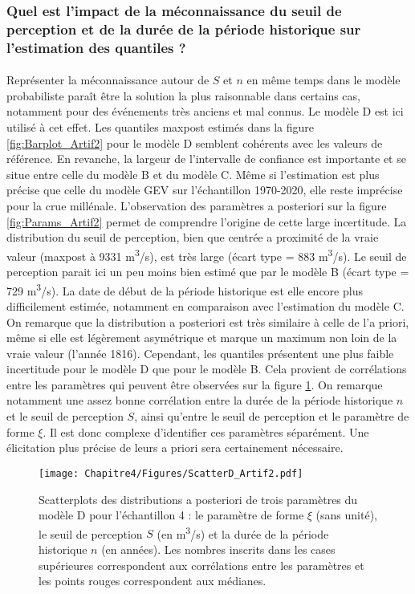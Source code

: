 	\subsubsection{Quel est l'impact de la méconnaissance du seuil de perception et de la durée de la période historique sur l'estimation des quantiles ?}	
	
	\paragraph{} Représenter la méconnaissance autour de $S$ et $n$ en même temps dans le modèle probabiliste paraît être la solution la plus raisonnable dans certains cas, notamment pour des événements très anciens et mal connus. Le modèle D est ici utilisé à cet effet. Les quantiles maxpost estimés dans la figure \ref{fig:Barplot_Artif2} pour le modèle D semblent cohérents avec les valeurs de référence. En revanche, la largeur de l'intervalle de confiance est importante et se situe entre celle du modèle B et du modèle C. Même si l'estimation est plus précise que celle du modèle GEV sur l'échantillon 1970-2020, elle reste imprécise pour la crue millénale. L'observation des paramètres a posteriori sur la figure \ref{fig:Params_Artif2} permet de comprendre l'origine de cette large incertitude. La distribution du seuil de perception, bien que centrée a proximité de la vraie valeur (maxpost à 9331 m\textsuperscript{3}/s), est très large (écart type = 883 m\textsuperscript{3}/s). Le seuil de perception parait ici un peu moins bien estimé que par le modèle B (écart type = 729 m\textsuperscript{3}/s). La date de début de la période historique est elle encore plus difficilement estimée, notamment en comparaison avec l'estimation du modèle C. On remarque que la distribution a posteriori est très similaire à celle de l'a priori, même si elle est légèrement asymétrique et marque un maximum non loin de la vraie valeur (l'année 1816). Cependant, les quantiles présentent une plus faible incertitude pour le modèle D que pour le modèle B. Cela provient de corrélations entre les paramètres qui peuvent être observées sur la figure \ref{fig:ScatterD_Artif2}. On remarque notamment une assez bonne corrélation entre la durée de la période historique $n$ et le seuil de perception $S$, ainsi qu'entre le seuil de perception et le paramètre de forme $\xi$. Il est donc complexe d'identifier ces paramètres séparément. Une élicitation plus précise de leurs a priori sera certainement nécessaire.
	
	\begin{figure}[h]
		\centering
		\texttt{[image: Chapitre4/Figures/ScatterD\_Artif2.pdf]}
		\caption{Scatterplots des distributions a posteriori de trois paramètres du modèle D pour l'échantillon 4 : le paramètre de forme $\xi$ (sans unité), le seuil de perception $S$ (en m\textsuperscript{3}/s) et la durée de la période historique $n$ (en années). Les nombres inscrits dans les cases supérieures correspondent aux corrélations entre les paramètres et les points rouges correspondent aux médianes.}
		\label{fig:ScatterD_Artif2}
	\end{figure}
		
